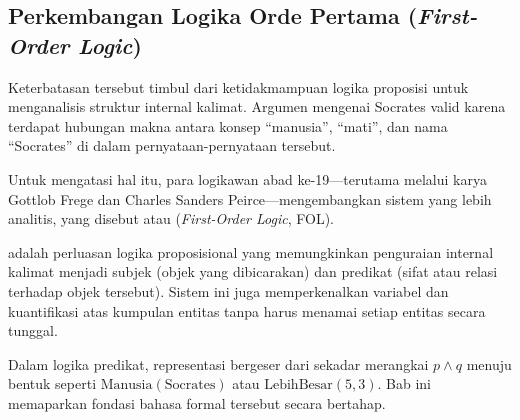 \subsection{Perkembangan Logika Orde Pertama (\textit{First-Order Logic})}

Keterbatasan tersebut timbul dari ketidakmampuan logika proposisi untuk menganalisis struktur internal kalimat. Argumen mengenai Socrates valid karena terdapat hubungan makna antara konsep ``manusia'', ``mati'', dan nama ``Socrates'' di dalam pernyataan-pernyataan tersebut.

Untuk mengatasi hal itu, para logikawan abad ke-19---terutama melalui karya Gottlob Frege dan Charles Sanders Peirce---mengembangkan sistem yang lebih analitis, yang disebut  atau  (\textit{First-Order Logic}, FOL).

\begin{definisi}
 adalah perluasan logika proposisional yang memungkinkan penguraian internal kalimat menjadi subjek (objek yang dibicarakan) dan predikat (sifat atau relasi terhadap objek tersebut). Sistem ini juga memperkenalkan variabel dan kuantifikasi atas kumpulan entitas tanpa harus menamai setiap entitas secara tunggal.
\end{definisi}

Dalam logika predikat, representasi bergeser dari sekadar merangkai $p \land q$ menuju bentuk seperti $\text{Manusia}(\text{Socrates})$ atau $\text{LebihBesar}(5, 3)$. Bab ini memaparkan fondasi bahasa formal tersebut secara bertahap.
